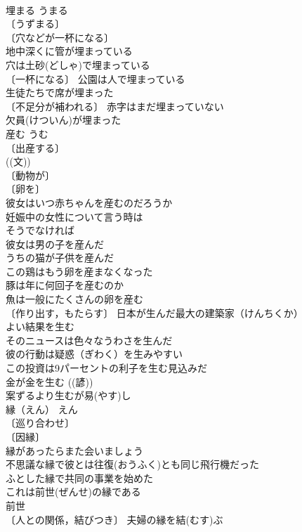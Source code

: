 \documentclass[8pt]{extreport}
\begin{document}
\begin{CJK}{UTF8}{min}
\\	埋まる	うまる　
\\	〔うずまる〕
\\	〔穴などが一杯になる〕
\\	地中深くに管が埋まっている 
\\	穴は土砂(どしゃ)で埋まっている 
\\	〔一杯になる〕 公園は人で埋まっている 
\\	生徒たちで席が埋まった 
\\	〔不足分が補われる〕 赤字はまだ埋まっていない 
\\	欠員(けついん)が埋まった 
\\	産む	うむ	
\\	〔出産する〕
\\	((文)) 
\\	〔動物が〕
\\	〔卵を〕
\\	彼女はいつ赤ちゃんを産むのだろうか 
\\	妊娠中の女性について言う時は
\\	そうでなければ
\\	彼女は男の子を産んだ 
\\	うちの猫が子供を産んだ 
\\	この鶏はもう卵を産まなくなった 
\\	豚は年に何回子を産むのか 
\\	魚は一般にたくさんの卵を産む 
\\	〔作り出す，もたらす〕 日本が生んだ最大の建築家（けんちくか） 
\\	よい結果を生む 
\\	そのニュースは色々なうわさを生んだ 
\\	彼の行動は疑惑（ぎわく）を生みやすい 
\\	この投資は9パーセントの利子を生む見込みだ 
\\	金が金を生む ((諺)) 
\\	案ずるより生むが易(やす)し 
\\	縁（えん）	えん	
\\	〔巡り合わせ〕
\\	〔因縁〕
\\	縁があったらまた会いましょう 
\\	不思議な縁で彼とは往復(おうふく)とも同じ飛行機だった 
\\	ふとした縁で共同の事業を始めた 
\\	これは前世(ぜんせ)の縁である 
\\	前世　
\\	〔人との関係，結びつき〕 夫婦の縁を結(むす)ぶ 

\end{CJK}
\end{document}
